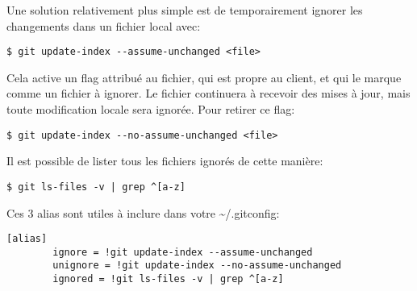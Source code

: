 \documentclass{../../common/tufte-latex/tufte-handout}
\begin{document}
Une solution relativement plus simple est de temporairement ignorer les changements dans un fichier local avec:
\begin{lstlisting}[style=BashInputStyle]
  $ git update-index --assume-unchanged <file>
\end{lstlisting}
Cela active un flag attribué au fichier, qui est propre au client, et qui le marque comme un fichier à ignorer.
Le fichier continuera à recevoir des mises à jour, mais toute modification locale sera ignorée.
Pour retirer ce flag:

\begin{lstlisting}[style=BashInputStyle]
  $ git update-index --no-assume-unchanged <file>
\end{lstlisting}

\noindent Il est possible de lister tous les fichiers ignorés de cette manière:

\begin{lstlisting}[style=BashInputStyle]
  $ git ls-files -v | grep ^[a-z]
\end{lstlisting}

\noindent Ces 3 alias sont utiles à inclure dans votre \textasciitilde/.gitconfig:

\begin{lstlisting}[style=BashInputStyle]
[alias]
        ignore = !git update-index --assume-unchanged 
        unignore = !git update-index --no-assume-unchanged
        ignored = !git ls-files -v | grep ^[a-z]
\end{lstlisting}



\end{document}
